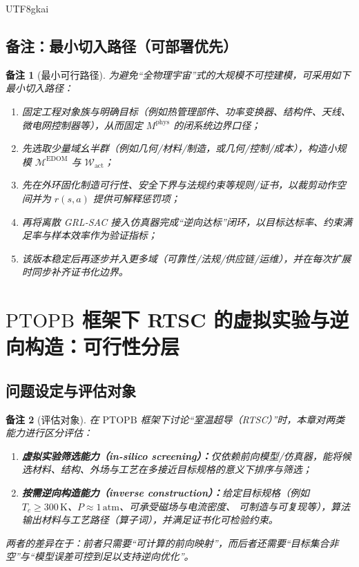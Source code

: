 \documentclass[12pt]{article}
\newtheorem{remark}{备注}[section]
\newcommand{\PTOPB}{\ensuremath{\mathrm{PTOPB}}}
\newcommand{\EDOM}{\ensuremath{\mathcal{M}^{\mathrm{EDOM}}}}
\begin{document}
\begin{CJK*}{UTF8}{gkai}
\subsection{备注：最小切入路径（可部署优先）}

\begin{remark}[最小可行路径]
为避免“全物理宇宙”式的大规模不可控建模，可采用如下最小切入路径：
\begin{enumerate}
  \item 固定工程对象族与明确目标（例如热管理部件、功率变换器、结构件、天线、微电网控制器等），从而固定 $M^{\mathrm{phys}}$ 的闭系统边界口径；
  \item 先选取少量域幺半群（例如几何/材料/制造，或几何/控制/成本），构造小规模 \EDOM{} 与 $\mathcal{W}_{\mathrm{act}}$；
  \item 先在外环固化制造可行性、安全下界与法规约束等规则/证书，以裁剪动作空间并为 $r(s,a)$ 提供可解释惩罚项；
  \item 再将离散 GRL-SAC 接入仿真器完成“逆向达标”闭环，以目标达标率、约束满足率与样本效率作为验证指标；
  \item 该版本稳定后再逐步并入更多域（可靠性/法规/供应链/运维），并在每次扩展时同步补齐证书化边界。
\end{enumerate}
\end{remark}

\clearpage
\section{\PTOPB{} 框架下 RTSC 的虚拟实验与逆向构造：可行性分层}
\label{sec:ptopb-rtsc}

\subsection{问题设定与评估对象}

\begin{remark}[评估对象]
在 \PTOPB{} 框架下讨论“室温超导（RTSC）”时，本章对两类能力进行区分评估：
\begin{enumerate}
  \item \textbf{虚拟实验筛选能力（in-silico screening）：}仅依赖前向模型/仿真器，能将候选材料、结构、外场与工艺在多接近目标规格的意义下排序与筛选；
  \item \textbf{按需逆向构造能力（inverse construction）：}给定目标规格（例如 $T_c\ge 300\,\mathrm{K}$、$P\approx 1\,\mathrm{atm}$、可承受磁场与电流密度、
    可制造与可复现等），算法输出材料与工艺路径（算子词），并满足证书化可检验约束。
\end{enumerate}
两者的差异在于：前者只需要“可计算的前向映射”，而后者还需要“目标集合非空”与“模型误差可控到足以支持逆向优化”。
\end{remark}


\end{CJK*}
\end{document}
